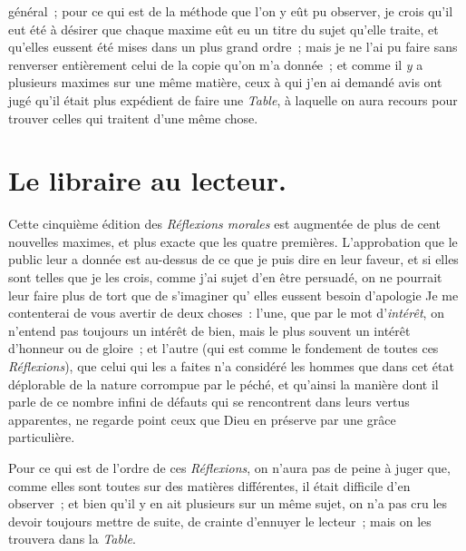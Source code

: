 \documentclass[french,twoside]{book} %
\newcommand{\signed}[1]{\bigbreak\filbreak{\raggedleft #1\par}\medskip}
\begin{document}
général ; pour ce qui est de la méthode que l’on y eût pu observer, je crois qu’il eut été à désirer que chaque maxime eût eu un titre du sujet qu’elle traite, et qu’elles eussent été mises dans un plus grand ordre ; mais je ne l’ai pu faire sans renverser entièrement celui de la copie qu’on m’a donnée ; et comme il {\itshape y} a plusieurs maximes sur une même matière, ceux à qui j’en ai demandé avis ont jugé qu’il était plus expédient de faire une {\itshape Table}, à laquelle on aura recours pour trouver celles qui traitent d’une même chose.
\section[{Le libraire au lecteur. [Préface de la cinquième édition (1678)]}]{Le libraire au lecteur. \\
[Préface de la cinquième édition (1678)]}\renewcommand{\leftmark}{Le libraire au lecteur. \\
[Préface de la cinquième édition (1678)]}

\noindent Cette cinquième édition des {\itshape Réflexions morales} est augmentée de plus de cent nouvelles maximes, et plus exacte que les quatre premières. L’approbation que le public leur a donnée est au-dessus de ce que je puis dire en leur faveur, et si elles sont telles que je les crois, comme j’ai sujet d’en être persuadé, on ne pourrait leur faire plus de tort que de s’imaginer qu’ elles eussent besoin d’apologie Je me contenterai de vous avertir de deux choses : l’une, que par le mot d’{\itshape intérêt}, on n’entend pas toujours un intérêt de bien, mais le plus souvent un intérêt d’honneur ou de gloire ; et l’autre (qui est comme le fondement de toutes ces {\itshape Réflexions}), que celui qui les a faites n’a considéré les hommes que dans cet état déplorable de la nature corrompue par le péché, et qu’ainsi la manière dont il parle de ce nombre infini de défauts qui se rencontrent dans leurs vertus apparentes, ne regarde point ceux que Dieu en préserve par une grâce particulière.\par
Pour ce qui est de l’ordre de ces {\itshape Réflexions}, on n’aura pas de peine à juger que, comme elles sont toutes sur des matières différentes, il était difficile d’en observer ; et bien qu’il y en ait plusieurs sur un même sujet, on n’a pas cru les devoir toujours mettre de suite, de crainte d’ennuyer le lecteur ; mais on les trouvera dans la {\itshape Table}.\par


\signed{François de La Rochefoucauld}
\end{document}
